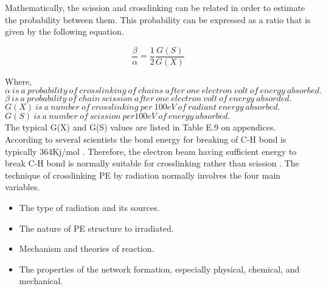 Mathematically, the scission and crosslinking can be related in order to estimate the probability between them. This probability can be expressed as a ratio that is given by the following equation.

\begin{equation}
    \frac{\beta}{\alpha}=\frac{1}{2}\frac{G(S)}{G(X)}
\end{equation}

\noindent Where, \\
$\alpha\ is\ a\ probability\ of\ crosslinking\ of\ chains\ after\ one\ electron\ volt\ of\ energy\ absorbed.$ \\
$\beta\ is\ a\ probability\ of\ chain\ scission\ after\ one\ electron\ volt\ of\ energy\ absorded.$ \\
$G(X)\ is\ a\ number\ of\ crosslinking\ per\ 100eV\ of\ radiant\ energy\ absorbed.$ \\
$G(S)\ is\ a\ number\ of\ scission\ per 100eV\ of\ energy\ absorbed.$ \\

The typical G(X) and G(S) values are listed in Table E.9 on appendices. \\

According to several scientists the bond energy for breaking of C-H bond is typically 364Kj/mol \cite{meola2005cross}. Therefore, the electron beam having sufficient energy to break C-H bond is normally suitable for crosslinking rather than scission \cite{meola2005cross}. The technique of crosslinking PE by radiation normally involves the four main variables. 

\begin{itemize}
    \item The type of radiation and its sources.
    \item The nature of PE structure to irradiated.
    \item Mechanism and theories of reaction.
    \item The properties of the network formation, especially physical, chemical, and mechanical. 
\end{itemize}

